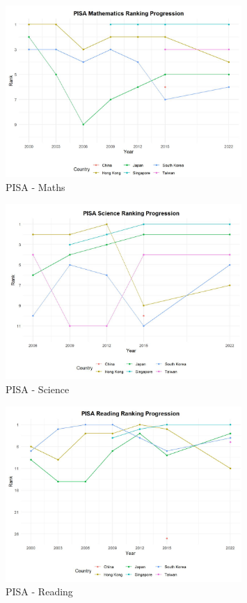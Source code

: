 \documentclass[12pt,a4paper,onecolumn]{article}
\numberwithin{equation}{section}
\begin{document}
\begin{figure}[ht!]
    \centering
        \includegraphics[width=0.8\textwidth]{PISA_maths.JPG}
    \caption{PISA - Maths}
    \label{fig:PISA_Maths}
\end{figure}

\begin{figure}[ht!]
    \centering
        \includegraphics[width=0.8\textwidth]{PISA_science.JPG}
    \caption{PISA - Science}
    \label{fig:PISA_Maths}
\end{figure}

\begin{figure}[ht!]
    \centering
        \includegraphics[width=0.8\textwidth]{PISA_reading.JPG}
    \caption{PISA - Reading}
    \label{fig:PISA_Maths}
\end{figure}
\end{document}
